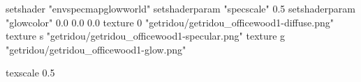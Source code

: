 setshader "envspecmapglowworld"
setshaderparam "specscale" 0.5
setshaderparam "glowcolor" 0.0 0.0 0.0
texture 0 "getridou/getridou_officewood1-diffuse.png"
texture s "getridou/getridou_officewood1-specular.png"
texture g "getridou/getridou_officewood1-glow.png"

texscale 0.5